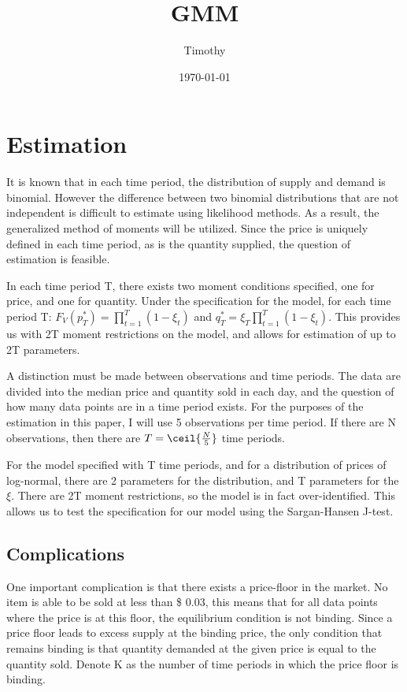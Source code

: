 \documentclass[11pt]{article}
\author{Timothy}
\date{\today}
\title{GMM}
\begin{document}
\maketitle
\tableofcontents


\section{Estimation}
\label{sec-1}
It is known that in each time period, the distribution of supply and
demand is binomial. However the difference between two binomial
distributions that are not independent is difficult to estimate using
likelihood methods. As a result, the generalized method of moments
will be utilized. Since the price is uniquely defined in each time
period, as is the quantity supplied, the question of estimation is
feasible.

In each time period T, there exists two moment conditions specified,
one for price, and one for quantity. Under the specification for the
model, for each time period T: $F_V ( p_T^* ) = \prod_{t=1}^T ( 1 - \xi_t )$ and
$q_T^* = \xi_T \prod_{t=1}^T ( 1 - \xi_t )$. This provides us with 2T moment
restrictions on the model, and allows for estimation of up to 2T
parameters. 

A distinction must be made between observations and time
periods. The data are divided into the median price and quantity
sold in each day, and the question of how many data points are in a
time period exists. For the purposes of the estimation in this paper,
I will use 5 observations per time period. If there are N
observations, then there are $T = \ceil{ \frac{ N }{5} }$ time periods.

For the model specified with T time periods, and for a distribution of
prices of log-normal, there are 2 parameters for the distribution, and
T parameters for the $\xi$. There are 2T moment restrictions, so the model
is in fact over-identified. This allows us to test the specification
for our model using the Sargan-Hansen J-test.

\subsection{Complications}
\label{sec-1-1}

One important complication is that there exists a price-floor in the
market. No item is able to be sold at less than \$ 0.03, this means
that for all data points where the price is at this floor, the
equilibrium condition is not binding. Since a price floor leads to
excess supply at the binding price, the only condition that remains
binding is that quantity demanded at the given price is equal to the
quantity sold. Denote K as the number of time periods in which the
price floor is binding.
\end{document}
